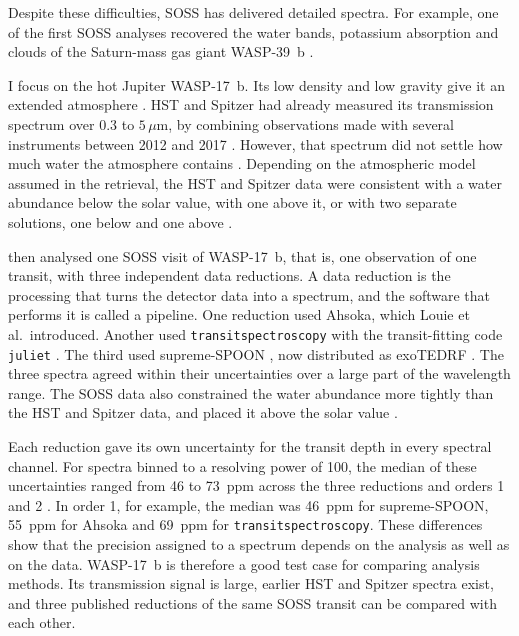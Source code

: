 Despite these difficulties, SOSS has delivered detailed spectra. For example,
one of the first SOSS analyses recovered the water bands, potassium absorption
and clouds of the Saturn-mass gas giant WASP-39~b \citep{FeinsteinEtAl2023}.

I focus on the hot Jupiter WASP-17~b. Its low density and low gravity give it
an extended atmosphere \citep{AndersonEtAl2010}. HST and Spitzer had already
measured its transmission spectrum over 0.3 to $5\,\mu\mathrm{m}$, by combining
observations made with several instruments between 2012 and 2017
\citep{AldersonEtAl2022}. However, that spectrum did not settle how much water the atmosphere contains \citep{LouieEtAl2025}. Depending on the
atmospheric model assumed in the retrieval, the HST and Spitzer data were
consistent with a water abundance below the solar value, with one above it, or
with two separate solutions, one below and one above
\citep{AldersonEtAl2022,LouieEtAl2025}.

\citet{LouieEtAl2025} then analysed one SOSS visit of WASP-17~b, that is, one observation of one transit, with three independent data reductions. A data reduction is the processing that turns the detector data into a spectrum, and the software that performs it is called a pipeline. One reduction used Ahsoka, which Louie et al.\ introduced. Another used \texttt{transitspectroscopy} \citep{Espinoza2022TransitSpectroscopy} with the transit-fitting code \texttt{juliet} \citep{EspinozaEtAl2019}. The third used supreme-SPOON \citep{RadicaEtAl2023}, now distributed as exoTEDRF \citep{Radica2024}. The
three spectra agreed within their uncertainties over a large part of the
wavelength range. The SOSS data also constrained the water abundance more tightly than the HST and Spitzer data, and placed it above the solar value \citep{LouieEtAl2025}.

Each reduction gave its own uncertainty for the transit depth in every
spectral channel. For spectra binned to a resolving power of 100, the median
of these uncertainties ranged from 46 to 73~ppm across the three reductions
and orders 1 and 2 \citep{LouieEtAl2025}. In order 1, for example, the median
was 46~ppm for supreme-SPOON, 55~ppm for Ahsoka and 69~ppm for
\texttt{transitspectroscopy}. These differences show that the precision
assigned to a spectrum depends on the analysis as well as on the data.
WASP-17~b is therefore a good test case for comparing analysis methods. Its
transmission signal is large, earlier HST and Spitzer spectra exist, and three
published reductions of the same SOSS transit can be compared with each other.

